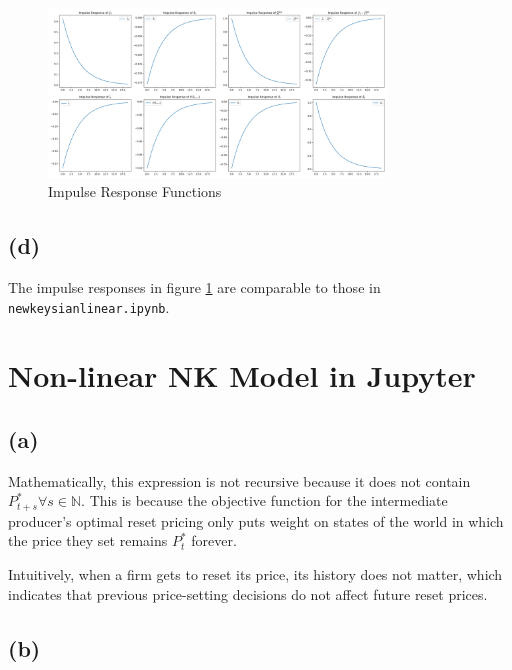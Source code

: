 \documentclass[12pt]{article}
\begin{document}
\begin{figure}[ht]
\centering
\includegraphics[width=0.8\textwidth]{figs/q1_IRFs.png}
\caption{Impulse Response Functions}
\label{fig:irf}
\end{figure}

\subsection*{(d)}

The impulse responses in figure \ref{fig:irf} are comparable to those in \texttt{newkeysianlinear.ipynb}.

\section{Non-linear NK Model in Jupyter}

\subsection*{(a)}

Mathematically, this expression is not recursive because it does not contain $P^{\ast}_{t+s} \forall s \in \mathbb{N}$. 
This is because the objective function for the intermediate producer's optimal reset pricing 
only puts weight on states of the world in which the price they set remains $P^{\ast}_{t}$ forever. 

Intuitively, when a firm gets to reset its price, its history does not matter,
which indicates that previous price-setting decisions do not affect future reset prices. 

\subsection*{(b)}
\end{document}
